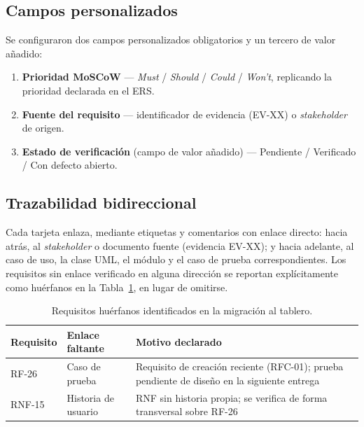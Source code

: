 \documentclass[journal,onecolumn]{IEEEtran}
\begin{document}
	\subsection{Campos personalizados}
	
	Se configuraron dos campos personalizados obligatorios y un tercero
	de valor añadido:
	
	\begin{enumerate}[label=\arabic*.]
		\item \textbf{Prioridad MoSCoW} --- \emph{Must} / \emph{Should} / \emph{Could} / \emph{Won't}, replicando la prioridad declarada en el ERS.
		\item \textbf{Fuente del requisito} --- identificador de evidencia (EV-XX) o \emph{stakeholder} de origen.
		\item \textbf{Estado de verificación} (campo de valor añadido) --- Pendiente / Verificado / Con defecto abierto.
	\end{enumerate}
	
	\subsection{Trazabilidad bidireccional}
	
	Cada tarjeta enlaza, mediante etiquetas y comentarios con enlace
	directo: hacia atrás, al \emph{stakeholder} o documento fuente
	(evidencia EV-XX); y hacia adelante, al caso de uso, la clase UML,
	el módulo y el caso de prueba correspondientes. Los requisitos sin
	enlace verificado en alguna dirección se reportan explícitamente
	como huérfanos en la Tabla~\ref{tab:huerfanos}, en lugar de
	omitirse.
	
	\begin{table}[H]
		\centering
		\caption{Requisitos huérfanos identificados en la migración al tablero.}
		\label{tab:huerfanos}
		\small
		\begin{tabularx}{\textwidth}{@{}l X l@{}}
			\toprule
			\textbf{Requisito} & \textbf{Enlace faltante} & \textbf{Motivo declarado} \\
			\midrule
			RF-26 & Caso de prueba & Requisito de creación reciente (RFC-01); prueba pendiente de diseño en la siguiente entrega \\
			RNF-15 & Historia de usuario & RNF sin historia propia; se verifica de forma transversal sobre RF-26 \\
			\bottomrule
		\end{tabularx}
	\end{table}
	
\end{document}
